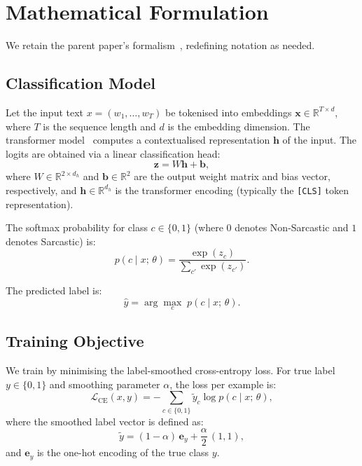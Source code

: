 
\section{Mathematical Formulation}\label{sec:math_formulation}

We retain the parent paper's formalism~\cite{oprea2025llm}, redefining notation as needed.

\subsection{Classification Model}\label{subsec:classification_model}

Let the input text $x = (w_1, \ldots, w_T)$ be tokenised into embeddings $\mathbf{x} \in \mathbb{R}^{T \times d}$, where $T$ is the sequence length and $d$ is the embedding dimension. The transformer model~\cite{vaswani2017attention} computes a contextualised representation $\mathbf{h}$ of the input. The logits are obtained via a linear classification head:
\begin{equation}\label{eq:logits}
    \mathbf{z} = W \mathbf{h} + \mathbf{b},
\end{equation}
where $W \in \mathbb{R}^{2 \times d_h}$ and $\mathbf{b} \in \mathbb{R}^{2}$ are the output weight matrix and bias vector, respectively, and $\mathbf{h} \in \mathbb{R}^{d_h}$ is the transformer encoding (typically the \texttt{[CLS]} token representation).

The softmax probability for class $c \in \{0, 1\}$ (where $0$ denotes Non-Sarcastic and $1$ denotes Sarcastic) is:
\begin{equation}\label{eq:softmax}
    p(c \mid x;\, \theta) = \frac{\exp(z_c)}{\sum_{c'} \exp(z_{c'})}.
\end{equation}

The predicted label is:
\begin{equation}\label{eq:prediction}
    \hat{y} = \arg\max_{c}\; p(c \mid x;\, \theta).
\end{equation}

\subsection{Training Objective}\label{subsec:training_objective}

We train by minimising the label-smoothed cross-entropy loss. For true label $y \in \{0, 1\}$ and smoothing parameter $\alpha$, the loss per example is:
\begin{equation}\label{eq:label_smoothed_ce}
    \mathcal{L}_{\text{CE}}(x, y) = -\sum_{c \in \{0,1\}} \tilde{y}_c \log p(c \mid x;\, \theta),
\end{equation}
where the smoothed label vector is defined as:
\begin{equation}\label{eq:smoothed_labels}
    \tilde{y} = (1 - \alpha)\, \mathbf{e}_y + \frac{\alpha}{2}\, (1, 1),
\end{equation}
and $\mathbf{e}_y$ is the one-hot encoding of the true class $y$.

